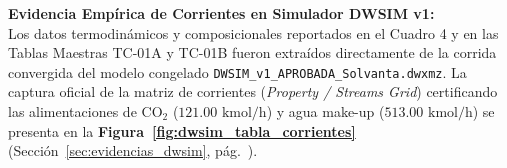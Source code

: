 \documentclass[11pt,letterpaper]{article}
\begin{document}
\vspace{0.2cm}
\begin{tcolorbox}[colback=aliceblue!40,colframe=navyblue,arc=2pt,boxrule=0.7pt,left=8pt,right=8pt,top=4pt,bottom=4pt]
\small\textbf{\color{navyblue}Evidencia Empírica de Corrientes en Simulador DWSIM v1:}\\
\footnotesize
Los datos termodinámicos y composicionales reportados en el Cuadro 4 y en las Tablas Maestras TC-01A y TC-01B fueron extraídos directamente de la corrida convergida del modelo congelado \texttt{DWSIM\_v1\_APROBADA\_Solvanta.dwxmz}. La captura oficial de la matriz de corrientes (\textit{Property / Streams Grid}) certificando las alimentaciones de $\text{CO}_2$ ($121.00\text{ kmol/h}$) y agua make-up ($513.00\text{ kmol/h}$) se presenta en la \textbf{Figura~\ref{fig:dwsim_tabla_corrientes}} (Sección~\ref{sec:evidencias_dwsim}, pág.~\pageref{fig:dwsim_tabla_corrientes}).
\end{tcolorbox}
\vspace{0.2cm}
\end{document}
